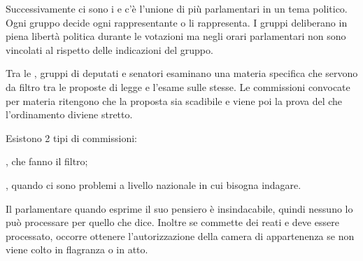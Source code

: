 \documentclass[letterpaper,10pt,italian]{sphinxmanual}
\begin{document}
\begin{figure}[htbp]
\centering

\noindent{}
\end{figure}

\sphinxAtStartPar
Successivamente ci sono i  e c’è l’unione di più parlamentari in un tema politico.
Ogni gruppo decide ogni rappresentante o li rappresenta. I gruppi deliberano in piena libertà politica durante
le votazioni ma negli orari parlamentari non sono vincolati al rispetto delle indicazioni del gruppo.

\begin{figure}[htbp]
\centering

\noindent{}
\end{figure}

\sphinxAtStartPar
Tra le , gruppi di deputati e senatori esaminano una materia specifica che servono
da filtro tra le proposte di legge e l’esame sulle stesse.
Le commissioni convocate per materia ritengono che la proposta sia scadibile e viene poi la prova del che
l’ordinamento diviene stretto.

\sphinxAtStartPar
Esistono 2 tipi di commissioni:

\sphinxAtStartPar
{}, che fanno il filtro;

\sphinxAtStartPar
{}, quando ci sono problemi a livello nazionale in cui bisogna indagare.

\begin{figure}[htbp]
\centering

\noindent{}
\end{figure}

\sphinxAtStartPar
{}

\sphinxAtStartPar
Il parlamentare quando esprime il suo pensiero è insindacabile, quindi nessuno lo può processare per quello che dice.
Inoltre se commette dei reati e deve essere processato, occorre ottenere l’autorizzazione della camera di
appartenenza se non viene colto in flagranza o in atto.

\begin{figure}[htbp]
\centering

\noindent{}
\end{figure}
\end{document}
